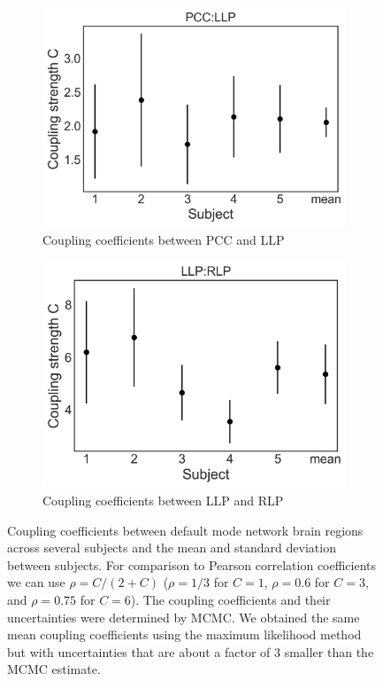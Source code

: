 \documentclass[%
 reprint,
 amsmath,amssymb,
 aps,
]{revtex4-1}
\begin{document}
\begin{figure}[H]
    \begin{subfigure}[b]{0.4\textwidth}
        \includegraphics[width=\textwidth]{pcc_llpMCMC.png}
        \caption{Coupling coefficients between PCC and LLP}
        \label{fig:llp_pcc}
    \end{subfigure}
    \begin{subfigure}[b]{0.4\textwidth}
        \includegraphics[width=\textwidth]{llp_rlpMCMC.png}
        \caption{Coupling coefficients between LLP and RLP}
        \label{fig:rlp_llp}
    \end{subfigure}
	\caption{Coupling coefficients between default mode network brain regions across several subjects and the mean and standard deviation between subjects.  For comparison to Pearson correlation coefficients we can use $\rho = C/(2+C)$ ($\rho=1/3$ for $C=1$, $\rho=0.6$ for $C=3$,  and $\rho=0.75$ for $C=6$).  The coupling coefficients and their uncertainties were determined by MCMC.  We obtained the same mean coupling coefficients using the maximum likelihood method but with uncertainties that are about a factor of 3 smaller than the MCMC estimate.}\label{fig:coupling_coef}
\end{figure}
\end{document}
